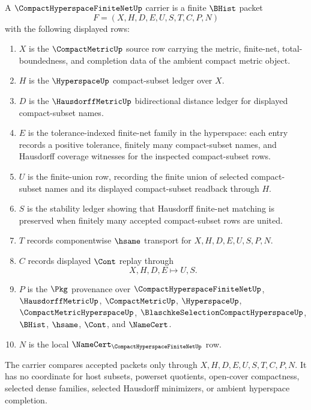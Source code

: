 \begin{definition}
\label{def:compact-hyperspace-finite-net-carrier}
A $\CompactHyperspaceFiniteNetUp$ carrier is a finite $\BHist$ packet
$$
F=(X,H,D,E,U,S,T,C,P,N)
$$
with the following displayed rows:
\begin{enumerate}
\item $X$ is the $\CompactMetricUp$ source row carrying the metric, finite-net, total-boundedness, and completion data of the ambient compact metric object.
\item $H$ is the $\HyperspaceUp$ compact-subset ledger over $X$.
\item $D$ is the $\HausdorffMetricUp$ bidirectional distance ledger for displayed compact-subset names.
\item $E$ is the tolerance-indexed finite-net family in the hyperspace: each entry records a positive tolerance, finitely many compact-subset names, and Hausdorff coverage witnesses for the inspected compact-subset rows.
\item $U$ is the finite-union row, recording the finite union of selected compact-subset names and its displayed compact-subset readback through $H$.
\item $S$ is the stability ledger showing that Hausdorff finite-net matching is preserved when finitely many accepted compact-subset rows are united.
\item $T$ records componentwise $\hsame$ transport for $X,H,D,E,U,S,P,N$.
\item $C$ records displayed $\Cont$ replay through
$$
X,H,D,E \longmapsto U,S .
$$
\item $P$ is the $\Pkg$ provenance over $\CompactHyperspaceFiniteNetUp$, $\HausdorffMetricUp$, $\CompactMetricUp$, $\HyperspaceUp$, $\CompactMetricHyperspaceUp$, $\BlaschkeSelectionCompactHyperspaceUp$, $\BHist$, $\hsame$, $\Cont$, and $\NameCert$.
\item $N$ is the local $\NameCert_{\CompactHyperspaceFiniteNetUp}$ row.
\end{enumerate}
The carrier compares accepted packets only through $X,H,D,E,U,S,T,C,P,N$. It has no coordinate for host subsets, powerset quotients, open-cover compactness, selected dense families, selected Hausdorff minimizers, or ambient hyperspace completion.
\end{definition}

